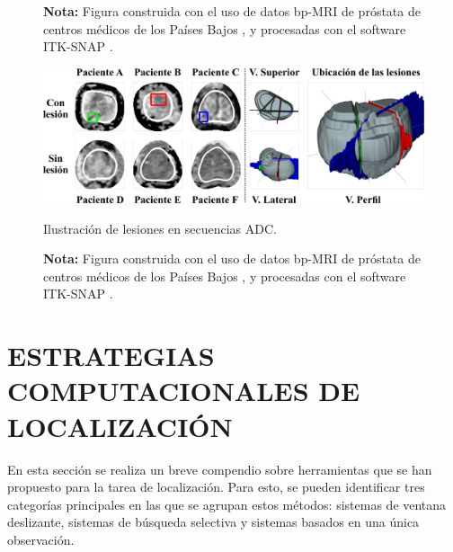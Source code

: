 \begin{figure}[h!]
\noindent \textbf{Nota:} Figura construida con el uso de datos bp-MRI de próstata de centros médicos de los Países Bajos , y  procesadas con el software ITK-SNAP .
\end{figure}



\begin{figure}[h!]
\centering
\caption{Ilustración de lesiones en secuencias ADC.}
\includegraphics[width=1\textwidth]{imgs/ADCSUMUP.png}
\label{fig:axADC}
\end{figure}

\begin{figure}[h!]
\noindent \textbf{Nota:} Figura construida con el uso de datos bp-MRI de próstata de centros médicos de los Países Bajos , y  procesadas con el software ITK-SNAP .
\end{figure}






\newpage
\section{ESTRATEGIAS COMPUTACIONALES DE LOCALIZACIÓN} \label{sec:comp_localiza}
En esta sección se realiza un breve compendio sobre herramientas que se han propuesto para la tarea de localización. 
Para esto, se pueden identificar tres categorías principales en las que se agrupan estos métodos: sistemas de ventana deslizante, sistemas de búsqueda selectiva y sistemas basados en una única observación.

